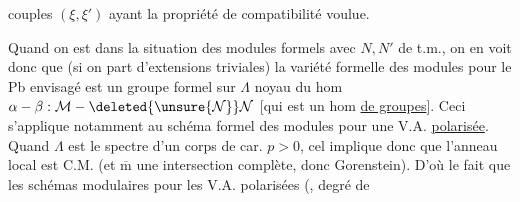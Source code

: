 couples $(\xi,\xi')$ ayant la propriété de compatibilité voulue.

Quand on est dans la situation des modules formels
 avec $N,N'$ de t.m., on en voit donc
que (si on part d'extensions triviales) la variété formelle des
modules pour le Pb envisagé est un groupe formel
 sur $\Lambda$
noyau du hom
$\alpha-\beta:\mathcal M-\deleted{\unsure{\mathcal N}}\mathcal N$
[qui est un hom \uline{de groupes}].
Ceci s'applique notamment au schéma formel des modules pour une
V.A. \uline{polarisée}. Quand $\Lambda$ est le spectre
d'un corps de car. $p>0$, cel implique donc que l'anneau local
 est C.M. (et $\overline{\mathrm m}$ 
une intersection complète, donc Gorenstein).
D'où le fait que les schémas  modulaires pour les
V.A. polarisées 
(, degré de
